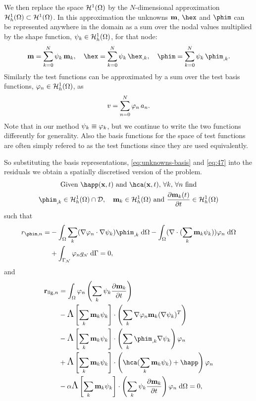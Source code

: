 We then replace the space $\mathcal{H}^1(\Omega)$ by the $N$-dimensional approximation ${\mathcal{H}^1_h(\Omega)} \subset \mathcal{H}^1(\Omega)$. In this approximation the unknowns $\mathbf{m}$, $\hex$ and $\phim$ can be represented anywhere in the domain as a sum over the nodal values multiplied by the shape function, ${\psi_k} \in {\mathcal{H}^1_h(\Omega)}$, for that node:
\begin{gather} %
  \mv = \sum_{k = 0}^{N} \sk \, \mv_k, \quad
  \hex = \sum_{k = 0}^{N} \sk \, \hex_{,k}, \quad
  \phim = \sum_{k = 0}^{N} \sk \, \phim_{,k}.
  \label{eq:unknowns-basis}
\end{gather}
Similarly the test functions can be approximated by a sum over the test basis functions, ${\varphi_n} \in {\mathcal{H}^1_h(\Omega)}$, as
\begin{equation}
  \label{eq:47}
  v = \sum_{n = 0}^{N} {\varphi_n} \, a_n.
\end{equation}
Note that in our method $\psi_k \equiv \varphi_k$, but we continue to write the two functions differently for generality. Also the basis functions for the space of test functions are often simply refered to as the test functions since they are used equivalently.

So substituting the basis representations, \eqref{eq:unknowns-basis} and \eqref{eq:47} into the residuals we obtain a spatially discretised version of the problem.
\begin{gather}
  \label{res:tintro}
  \text{Given $\happ(\xv,t)$ and $\hca(\xv,t)$, $\forall k$, $\forall \ndi$ find} \notag \\
  \phim_{,k} \in \ts \cap \Dfs, \quad
  \mv_{k} \in \ts \text{ and }
  \pd{\mv_k(t)}{t} \in \ts \notag
\end{gather}
such that
\begin{align}
  r_{\phim, \ndi} =
  & - \int_{\magd} \sum_k (\nabla \tn \cdot \nabla \sk) \phim_{,k} \d \magd \notag
  - \int_{\magd} (\nabla \cdot (\sum_k \mv_k \sk) ) \tn \d \magd \\
  & + \int_{\boundd_{\Neu}} \tn g_\Neu \d \boundd = 0,
  \label{res:tphi}
\end{align}
and
\begin{align*}
  \mathbf{r}_{\text{llg},\ndi} &=
  \int_{\magd} \tn \left(\sum_k \sk \pd{\mv_k}{t} \right)
  \\
  &- \crossop{\sum_k \mv_k \sk}{\sum_k \nabla \tn \mv_k (\nabla \sk)^T}
  \\
  &- \crossop{\sum_k \mv_k \sk}{\sum_k \phim_{,k} \nabla \sk} \tn
  \\
  &+ \crossop{\sum_k \mv_k \sk}{\hca(\sum_k \mv_k \sk) + \happ} \tn
  \\
  &- \dampc \crossop{\sum_k \mv_k \sk} {\sum_k \sk \pd{\mv_k}{t}} \tn \d \magd = 0,
\end{align*}


